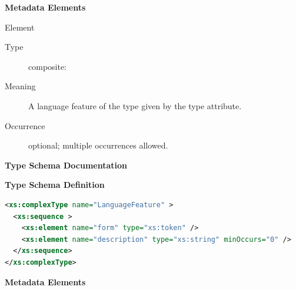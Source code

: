 \documentclass{ivoa}
\begin{document}
\vspace{0.5ex}\noindent\textbf{ Metadata Elements}

\begingroup\small\begin{bigdescription}\item[Element \xmlel{feature}]
\begin{description}
\item[Type] composite: 
\item[Meaning] 
            A language feature of the type given by the
            type attribute.
          
\item[Occurrence] optional; multiple occurrences allowed.

\end{description}


\end{bigdescription}\endgroup

\endgroup

\begingroup
      	\renewcommand*\descriptionlabel[1]{%
      	\hbox to 5.5em{\emph{#1}\hfil}}
      	\vspace{2ex}\noindent\textbf{ Type Schema Documentation}


\vspace{1ex}\noindent\textbf{ Type Schema Definition}

\begin{lstlisting}[language=XML,basicstyle=\footnotesize]
<xs:complexType name="LanguageFeature" >
  <xs:sequence >
    <xs:element name="form" type="xs:token" />
    <xs:element name="description" type="xs:string" minOccurs="0" />
  </xs:sequence>
</xs:complexType>
\end{lstlisting}

\vspace{0.5ex}\noindent\textbf{ Metadata Elements}
\end{document}
